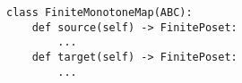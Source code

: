 \par\begin{minipage}{60ex}
\begin{verbatim}
class FiniteMonotoneMap(ABC):
    def source(self) -> FinitePoset:
        ...
    def target(self) -> FinitePoset:
        ...
\end{verbatim}
\end{minipage}\par